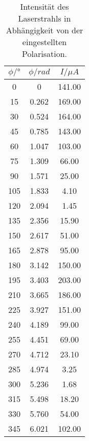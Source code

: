 \begin{table}
\centering
\caption{Intensität des Laserstrahls in Abhängigkeit von der eingestellten Polarisation.}
\label{tab:pol_data}
\begin{tabular}{c c c}
\toprule
$\phi/°$ & $\phi/rad$ & $I/\mu A$ \\
\midrule
0 & 0 & 141.00 \\
15 & 0.262 & 169.00 \\
30 & 0.524 & 164.00 \\
45 & 0.785 & 143.00 \\
60 & 1.047 & 103.00 \\
75 & 1.309 & 66.00 \\
90 & 1.571 & 25.00 \\
105 & 1.833 & 4.10 \\
120 & 2.094 & 1.45 \\
135 & 2.356 & 15.90 \\
150 & 2.617 & 51.00 \\
165 & 2.878 & 95.00 \\
180 & 3.142 & 150.00 \\
195 & 3.403 & 203.00 \\
210 & 3.665 & 186.00 \\
225 & 3.927 & 151.00 \\
240 & 4.189 & 99.00 \\
255 & 4.451 & 69.00 \\
270 & 4.712 & 23.10 \\
285 & 4.974 & 3.25 \\
300 & 5.236 & 1.68 \\
315 & 5.498 & 18.20 \\
330 & 5.760 & 54.00 \\
345 & 6.021 & 102.00 \\
\bottomrule
\end{tabular}
\end{table}